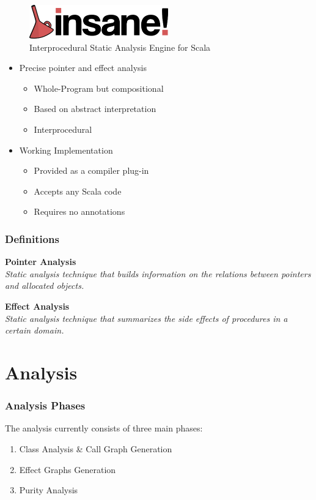 \documentclass[hyperref={pdfpagelabels=false}]{beamer}
\begin{document}
\begin{frame}[label=overview]
    \begin{figure}[t]
        \includegraphics[width=60mm]{../../logo.png}\\
        Interprocedural Static Analysis Engine for Scala
    \end{figure}

    \begin{itemize}
        \item Precise pointer and effect analysis
            \begin{itemize}
                \item Whole-Program but compositional
                \item Based on abstract interpretation
                \item Interprocedural
            \end{itemize}
        \item Working Implementation
            \begin{itemize}
                \item Provided as a compiler plug-in
                \item Accepts any Scala code
                \item Requires no annotations
            \end{itemize}
    \end{itemize}
\end{frame}

\begin{frame}
\frametitle{Definitions}
    \textbf{Pointer Analysis}\\
    \emph{Static analysis technique that builds information on the
relations between pointers and allocated objects.}

    \vspace{30pt}

    \textbf{Effect Analysis}\\
    \emph{Static analysis technique that summarizes the side effects
of procedures in a certain domain.}
\end{frame}

\section{Analysis}
\begin{frame}
    \frametitle{Analysis Phases}
    The analysis currently consists of three main phases:
    \begin{enumerate}
        \item Class Analysis \& Call Graph Generation
        \item Effect Graphs Generation
        \item Purity Analysis
    \end{enumerate}
\end{frame}
\end{document}
